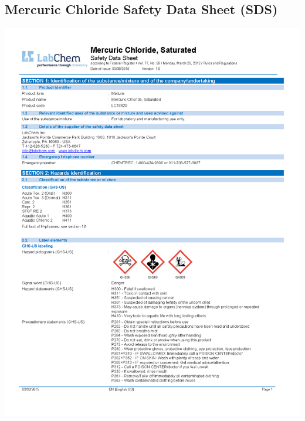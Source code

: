 \documentclass[]{book}
\begin{document}
\hypertarget{mercuric-chloride-safety-data-sheet-sds}{%
\subsection{Mercuric Chloride Safety Data Sheet (SDS)}\label{mercuric-chloride-safety-data-sheet-sds}}

\includegraphics[width=1\textwidth,height=\textheight]{images/Saturated-Mercuric-Chloride-SDS_Page_1.png}
\end{document}

